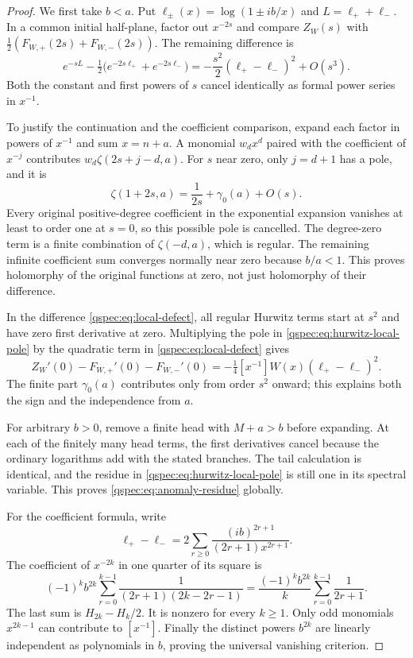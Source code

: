 \documentclass[11pt,letterpaper]{article}
\numberwithin{equation}{section}
\theoremstyle{definition}
\begin{document}
\begin{proof}
We first take $b<a$. Put $\ell_\pm(x)=\log(1\pm ib/x)$ and
$L=\ell_++\ell_-$. In a common initial half-plane, factor out $x^{-2s}$
and compare $Z_W(s)$ with
$\tfrac12(F_{W,+}(2s)+F_{W,-}(2s))$. The remaining difference is
\begin{equation}\label{qspec:eq:local-defect}
e^{-sL}-\tfrac12\bigl(e^{-2s\ell_+}+e^{-2s\ell_-}\bigr)
=-\frac{s^2}{2}(\ell_+-\ell_-)^2+O(s^3).
\end{equation}
Both the constant and first powers of $s$ cancel identically as formal
power series in $x^{-1}$.

To justify the continuation and the coefficient comparison, expand each
factor in powers of $x^{-1}$ and sum $x=n+a$. A monomial $w_dx^d$
paired with the coefficient of $x^{-j}$ contributes
$w_d\zeta(2s+j-d,a)$. For $s$ near zero, only $j=d+1$ has a pole,
and it is
\begin{equation}\label{qspec:eq:hurwitz-local-pole}
\zeta(1+2s,a)=\frac1{2s}+\gamma_0(a)+O(s).
\end{equation}
Every original positive-degree coefficient in the exponential expansion
vanishes at least to order one at $s=0$, so this possible pole is
cancelled. The degree-zero term is a finite combination of $\zeta(-d,a)$,
which is regular. The remaining infinite coefficient sum converges
normally near zero because $b/a<1$. This proves holomorphy of the
original functions at zero, not just holomorphy of their difference.

In the difference \eqref{qspec:eq:local-defect}, all regular Hurwitz
terms start at $s^2$ and have zero first derivative at zero. Multiplying
the pole in \eqref{qspec:eq:hurwitz-local-pole} by the quadratic term
in \eqref{qspec:eq:local-defect} gives
\[
Z_W'(0)-F_{W,+}'(0)-F_{W,-}'(0)
=-\tfrac14[x^{-1}]W(x)(\ell_+-\ell_-)^2.
\]
The finite part $\gamma_0(a)$ contributes only from order $s^2$ onward;
this explains both the sign and the independence from $a$.

For arbitrary $b>0$, remove a finite head with $M+a>b$ before expanding.
At each of the finitely many head terms, the first derivatives cancel
because the ordinary logarithms add with the stated branches. The tail
calculation is identical, and the residue in
\eqref{qspec:eq:hurwitz-local-pole} is still one in its spectral variable.
This proves \eqref{qspec:eq:anomaly-residue} globally.

For the coefficient formula, write
\[
\ell_+-\ell_-=2\sum_{r\ge0}\frac{(ib)^{2r+1}}{(2r+1)x^{2r+1}}.
\]
The coefficient of $x^{-2k}$ in one quarter of its square is
\[
(-1)^kb^{2k}\sum_{r=0}^{k-1}
\frac1{(2r+1)(2k-2r-1)}
=\frac{(-1)^kb^{2k}}k\sum_{r=0}^{k-1}\frac1{2r+1}.
\]
The last sum is $H_{2k}-H_k/2$. It is nonzero for every $k\ge1$.
Only odd monomials $x^{2k-1}$ can contribute to $[x^{-1}]$.
Finally the distinct powers $b^{2k}$ are linearly independent as
polynomials in $b$, proving the universal vanishing criterion.
\end{proof}
\end{document}
